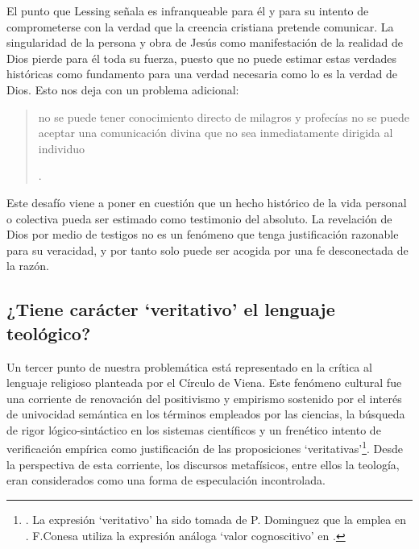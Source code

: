 El punto que Lessing señala es infranqueable para él y para su intento de comprometerse con la verdad que la creencia cristiana pretende comunicar. La singularidad de la persona y obra de Jesús como manifestación de la realidad de Dios pierde para él toda su fuerza, puesto que no puede estimar estas verdades históricas como fundamento para una verdad necesaria como lo es la verdad de Dios. Esto nos deja con un problema adicional: \blockquote[{\Cite[294]{prades2015testimonio}}.]{no se puede tener conocimiento directo de milagros y profecías \textelp{} no se puede aceptar una comunicación divina que no sea inmediatamente dirigida al individuo}.

Este desafío viene a poner en cuestión que un hecho histórico de la vida personal o colectiva pueda ser estimado como testimonio del absoluto. La revelación de Dios por medio de testigos no es un fenómeno que tenga justificación razonable para su veracidad, y por tanto solo puede ser acogida por una fe desconectada de la razón.

\subsection{¿Tiene carácter `veritativo' el lenguaje teológico?}
\label{subsec:viena}
Un tercer punto de nuestra problemática está representado en la crítica al lenguaje religioso planteada por el Círculo de Viena. Este fenómeno cultural fue una corriente de renovación del positivismo y empirismo sostenido por el interés de univocidad semántica en los términos empleados por las ciencias, la búsqueda de rigor lógico-sintáctico en los sistemas científicos y un frenético intento de verificación empírica como justificación de las proposiciones `veritativas'\footnote{\Cite[Cf.][152]{dominguez2009at}. La expresión `veritativo' ha sido tomada de P. Dominguez que la emplea en \cite[155]{dominguez2009at}. F.Conesa utiliza la expresión análoga `valor cognoscitivo' en \Cite{conesa1994cc}.}. Desde la perspectiva de esta corriente, los discursos metafísicos, entre ellos la teología, eran considerados como una forma de especulación incontrolada.

